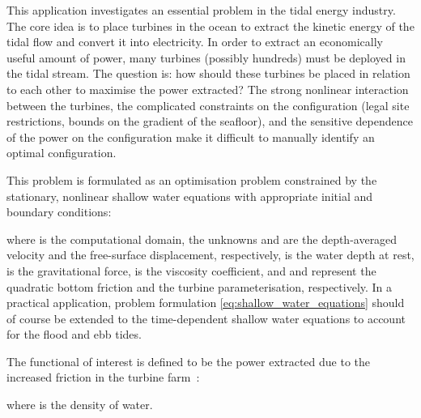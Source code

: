 \documentclass[prodmode,acmtoms]{acmsmall}
\begin{document}
This application investigates an essential problem in the tidal energy industry.
The core idea is to place turbines in the ocean to extract the kinetic energy of the tidal flow and convert it into electricity.
In order to extract an economically useful amount of power, many turbines (possibly hundreds) must be deployed in the tidal stream.
The question is: how should these turbines be placed in relation to each other to maximise the power extracted?
The strong nonlinear interaction between the turbines, the complicated constraints on the configuration (legal site
restrictions, bounds on the gradient of the seafloor), and the sensitive dependence of the power on the configuration make it difficult to
manually identify an optimal configuration.

This problem is formulated as an optimisation problem
constrained by the stationary, nonlinear shallow water equations with appropriate initial and boundary conditions:

where  is the computational domain, the unknowns  and  are the depth-averaged velocity and the free-surface displacement, 
respectively,  is the water depth at rest,  is the gravitational force,  is the viscosity coefficient, 
and  and  represent the quadratic bottom friction and the turbine parameterisation, respectively. In a practical
application, problem formulation \eqref{eq:shallow_water_equations} should of course be extended to the time-dependent shallow water equations to account for the
flood and ebb tides.

The functional of interest  is defined to be the power extracted due to the increased friction in the turbine farm~\cite{ben2007,divett2011}:

where  is the density of water.
\end{document}

